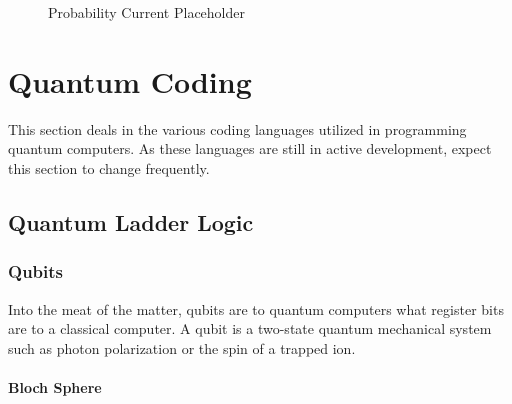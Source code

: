 \documentclass[a4paper]{article}
\begin{document}
\begin{figure} %
\caption{Probability Current Placeholder}\label{ProbCurrent1}
\end{figure}


\newpage %

\section{Quantum Coding}
This section deals in the various coding languages utilized in programming quantum computers.  As these languages are still in active development, expect this section to change frequently.

\subsection{Quantum Ladder Logic}
\label{QladderLogicHere} %
\subsubsection{Qubits} %
\label{Qubits}
Into the meat of the matter, qubits are to quantum computers what register bits are to a classical computer. A qubit is a two-state quantum mechanical system such as photon polarization or the spin of a trapped ion.

\paragraph{Bloch Sphere} %
\end{document}

